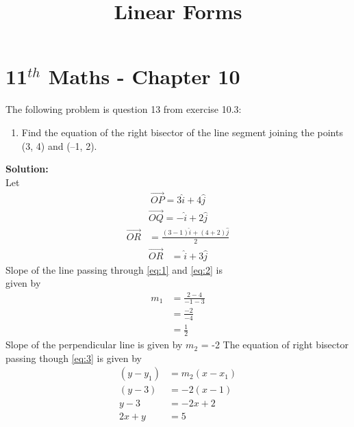 \documentclass[12pt]{article}
\newcommand{\solution}{\noindent \textbf{Solution: }}
\begin{document}
\graphicspath{{./Documents}{./figs}}
\begin{center}
  \title{\textbf{Linear Forms}}
  \date{\vspace{-5ex}}
  \maketitle
\end{center}
\setcounter{page}{1}
\section*{11$ ^{th} $ Maths - Chapter 10}
The following problem is question 13 from exercise 10.3:
\begin{enumerate}
  \item Find the equation of the right bisector of the
 line segment joining the points (3, 4) and (–1, 2).
\end{enumerate}
\solution \\
Let \\
\begin{align}
    \overrightarrow{OP} = 3 \hat{i} + 4 \hat{j}
    \label{eq:1}
    \end{align}
    \begin{align}
    \overrightarrow{OQ} = - \hat{i} + 2 \hat{j}
    \label{eq:2}
    \end{align}
    \begin{align}
    \overrightarrow{OR} &= \frac{( 3 - 1 )\hat{i} + (4 + 2)\hat{j}}{2}
    \label{eq:3}
    \end{align}
    \begin{align}
    \overrightarrow{OR} &=\hat{i} + 3 \hat{j}
\end{align}
Slope of the line passing through \eqref{eq:1} and \eqref{eq:2} is\\
given by
\begin{align}
    m_1 &= \frac{2 - 4}{-1 - 3}\\
    &= \frac{-2}{-4}\\
    &= \frac{1}{2}
\end{align}
Slope of the perpendicular line is given by $ m_2 $ = -2
The equation of right bisector passing though \eqref{eq:3} is given by
\begin{align}
    ( y - y_1 ) &= m_2 ( x - x_1 )\\
    ( y - 3 ) &= -2 ( x - 1 )\\
     y - 3 &= - 2x + 2 \\
     2x + y &= 5
\end{align}
\end{document}
